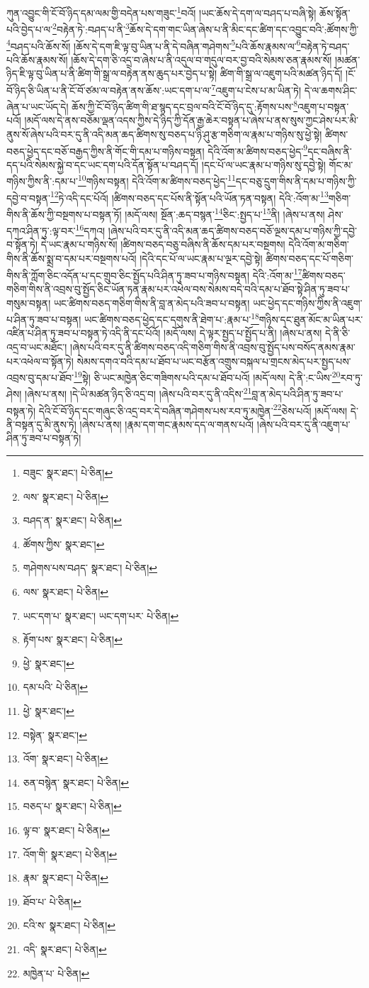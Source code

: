 ཀུན་འབྱུང་གི་ངོ་བོ་ཉིད་དམ་ལམ་གྱི་བདེན་པས་གཟུང་\footnote{བཟུང་  སྣར་ཐང་།  པེ་ཅིན། }བའོ། །ཡང་ཆོས་དེ་དག་ལ་བཤད་པ་བཞི་སྟེ། ཆོས་སྟོན་པའི་བྱེད་པ་ལ་\footnote{ལས་  སྣར་ཐང་།  པེ་ཅིན། }བརྟེན་ཏེ་:བཤད་པ་ནི་\footnote{བཤད་ན་  སྣར་ཐང་།  པེ་ཅིན། }ཆོས་དེ་དག་གང་ཡིན་ཞེས་པ་ནི་མིང་དང་ཚིག་དང་འབྱུང་བའི་:ཚོགས་ཀྱི་\footnote{ཚོགས་ཀྱིས་  སྣར་ཐང་། }བཤད་པའི་ཆོས་སོ། །ཆོས་དེ་དག་ཇི་ལྟ་བུ་ཡིན་པ་ནི་དེ་བཞིན་གཤེགས་\footnote{གཤེགས་པས་བཤད་  སྣར་ཐང་།  པེ་ཅིན། }པའི་ཆོས་རྣམས་ལ་\footnote{ལས་  སྣར་ཐང་།  པེ་ཅིན། }བརྟེན་ཏེ་བཤད་པའི་ཆོས་རྣམས་སོ། །ཆོས་དེ་དག་ཅི་འདྲ་བ་ཞེས་པ་ནི་འདུལ་བ་གདུལ་བར་བྱ་བའི་སེམས་ཅན་རྣམས་སོ། །མཚན་ཉིད་ཇི་ལྟ་བུ་ཡིན་པ་ནི་ཚིག་གི་སྒྲ་ལ་བརྟེན་ནས་ཆུད་པར་བྱེད་པ་སྟེ། ཚིག་གི་སྒྲ་ལ་འཇུག་པའི་མཚན་ཉིད་དོ། །ངོ་བོ་ཉིད་ཅི་ཡིན་པ་ནི་ངོ་བོ་ཙམ་ལ་བརྟེན་ནས་ཆོས་:ཡང་དག་པ་ལ་\footnote{ཡང་དག་པ་  སྣར་ཐང་། ཡང་དག་པར་  པེ་ཅིན། }འཇུག་པ་ངེས་པ་མ་ཡིན་ཏེ། དེ་ལ་ཆགས་ཤིང་ཞེན་པ་ཡང་ཡོད་དེ། ཆོས་ཀྱི་ངོ་བོ་ཉིད་ཚིག་གི་ཐ་སྙད་དང་བྲལ་བའི་ངོ་བོ་ཉིད་དུ་:རྟོགས་པས་\footnote{རྟོག་པས་  སྣར་ཐང་།  པེ་ཅིན། }འཇུག་པ་བསྟན་པའོ། །མདོ་ལས་དེ་ནས་བཅོམ་ལྡན་འདས་ཀྱིས་དེ་ཉིད་ཀྱི་དོན་རྒྱ་ཆེར་བསྟན་པ་ཞེས་པ་ནས་སུས་ཀྱང་ཤེས་པར་མི་ནུས་སོ་ཞེས་པའི་བར་དུ་ནི་འདི་མན་ཆད་ཚིགས་སུ་བཅད་པ་ཉི་ཤུ་རྩ་གཅིག་ལ་རྣམ་པ་གཉིས་སུ་ཕྱེ་སྟེ། ཚིགས་བཅད་ཕྱེད་དང་བཅོ་བརྒྱད་ཀྱིས་ནི་གོང་གི་དམ་པ་གཉིས་བསྟན། དེའི་འོག་མ་ཚིགས་བཅད་ཕྱེད་\footnote{ཕྱེ་  སྣར་ཐང་། }དང་བཞིས་ནི་དད་པའི་སེམས་སྐྱེ་བ་དང་ཡང་དག་པའི་དོན་སྟོན་པ་བཤད་དོ། །དང་པོ་ལ་ཡང་རྣམ་པ་གཉིས་སུ་དབྱེ་སྟེ། གོང་མ་གཉིས་ཀྱིས་ནི་:དམ་པ་\footnote{དམ་པའི་  པེ་ཅིན། }གཉིས་བསྟན། དེའི་འོག་མ་ཚིགས་བཅད་ཕྱེད་\footnote{ཕྱེ་  སྣར་ཐང་། }དང་བཅུ་དྲུག་གིས་ནི་དམ་པ་གཉིས་ཀྱི་དབྱེ་བ་བསྟན་\footnote{བསྟེན་  སྣར་ཐང་། }ཏེ་འདི་དང་པོའོ། །ཚིགས་བཅད་དང་པོས་ནི་སྟོན་པའི་ཡོན་ཏན་བསྟན། དེའི་:འོག་མ་\footnote{འོག་  སྣར་ཐང་།  པེ་ཅིན། }གཅིག་གིས་ནི་ཆོས་ཀྱི་བསྔགས་པ་བསྟན་ཏོ། །མདོ་ལས། སྔོན་:ཆད་བསྙན་\footnote{ཅན་བསྙེན་  སྣར་ཐང་།  པེ་ཅིན། }ཅིང་:སྤྱད་པ་\footnote{བཅད་པ་  སྣར་ཐང་།  པེ་ཅིན། }ནི། །ཞེས་པ་ནས། ཤེས་དཀའ་ཤིན་ཏུ་:ལྟ་བར་\footnote{ལྟ་བ་  སྣར་ཐང་།  པེ་ཅིན། }དཀའ། །ཞེས་པའི་བར་དུ་ནི་འདི་མན་ཆད་ཚིགས་བཅད་བཅོ་ལྔས་དམ་པ་གཉིས་ཀྱི་དབྱེ་བ་སྟོན་ཏེ། དེ་ཡང་རྣམ་པ་གཉིས་སོ། །ཚིགས་བཅད་བཅུ་བཞིས་ནི་ཆོས་དམ་པར་བསྔགས། དེའི་འོག་མ་གཅིག་གིས་ནི་ཆོས་སྨྲ་བ་དམ་པར་བསྔགས་པའོ། །དེའི་དང་པོ་ལ་ཡང་རྣམ་པ་ལྔར་དབྱེ་སྟེ། ཚིགས་བཅད་དང་པོ་གཅིག་གིས་ནི་ཀློག་ཅིང་འདོན་པ་དང་གྲུབ་ཅིང་སྤྱོད་པའི་ཤིན་ཏུ་ཟབ་པ་གཉིས་བསྟན། དེའི་:འོག་མ་\footnote{འོག་གི་  སྣར་ཐང་།  པེ་ཅིན། }ཚིགས་བཅད་གཅིག་གིས་ནི་འབྲས་བུ་སྤྱོད་ཅིང་ཡོན་ཏན་རྣམ་པར་འཕེལ་བས་སེམས་བདེ་བའི་དམ་པ་ཐོབ་སྟེ་ཤིན་ཏུ་ཟབ་པ་གསུམ་བསྟན། ཡང་ཚིགས་བཅད་གཅིག་གིས་ནི་བླ་ན་མེད་པའི་ཟབ་པ་བསྟན། ཡང་ཕྱེད་དང་གཉིས་ཀྱིས་ནི་འཇུག་པ་ཤིན་ཏུ་ཟབ་པ་བསྟན། ཡང་ཚིགས་བཅད་ཕྱེད་དང་དགུས་ནི་ཐེག་པ་:རྣམ་པ་\footnote{རྣམ་  སྣར་ཐང་།  པེ་ཅིན། }གཉིས་དང་ཐུན་མོང་མ་ཡིན་པར་འཛིན་པ་ཤིན་ཏུ་ཟབ་པ་བསྟན་ཏེ་འདི་ནི་དང་པོའོ། །མདོ་ལས། དེ་ལྟར་སྤྱད་པ་སྤྱོད་པ་ནི། །ཞེས་པ་ནས། དེ་ནི་ཅི་འདྲ་བ་ཡང་མཐོང་། །ཞེས་པའི་བར་དུ་ནི་ཚིགས་བཅད་འདི་གཅིག་གིས་ནི་འབྲས་བུ་སྤྱོད་པས་བསོད་ནམས་རྣམ་པར་འཕེལ་བ་སྟོན་ཏེ། སེམས་དགའ་བའི་དམ་པ་ཐོབ་པ་ཡང་བརྩོན་འགྲུས་བསྐལ་པ་གྲངས་མེད་པར་སྤྱད་པས་འབྲས་བུ་དམ་པ་ཐོབ་\footnote{ཐོབ་པ་  པེ་ཅིན། }སྟེ། ཅི་ཡང་མཁྱེན་ཅིང་གཟིགས་པའི་དམ་པ་ཐོབ་པའོ། །མདོ་ལས། དེ་ནི་:ང་ཡིས་\footnote{ངའི་ས་  སྣར་ཐང་།  པེ་ཅིན། }རབ་ཏུ་ཤེས། །ཞེས་པ་ནས། །དེ་ཡི་མཚན་ཉིད་ཅི་འདྲ་བ། །ཞེས་པའི་བར་དུ་ནི་འདིས་\footnote{འདི་  སྣར་ཐང་།  པེ་ཅིན། }བླ་ན་མེད་པའི་ཤིན་ཏུ་ཟབ་པ་བསྟན་ཏེ། དེའི་ངོ་བོ་ཉིད་དང་གཞུང་ཅི་འདྲ་བར་དེ་བཞིན་གཤེགས་པས་རབ་ཏུ་མཁྱེན་\footnote{མཁྱེན་པ་  པེ་ཅིན། }ཅེས་པའོ། །མདོ་ལས། དེ་ནི་བསྟན་དུ་མི་ནུས་ཏེ། །ཞེས་པ་ནས། །རྣམ་དག་གང་རྣམས་དད་ལ་གནས་པའོ། །ཞེས་པའི་བར་དུ་ནི་འཇུག་པ་ཤིན་ཏུ་ཟབ་པ་བསྟན་ཏེ། 